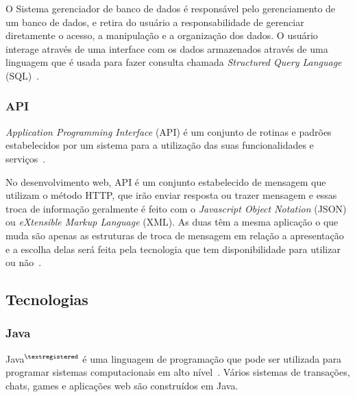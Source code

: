 

O Sistema gerenciador de banco de dados é responsável pelo gerenciamento de um banco de dados, e retira do usuário a responsabilidade de gerenciar diretamente o acesso, a manipulação e a organização dos dados.
O usuário interage através de uma interface com os dados armazenados através de uma linguagem que é usada para fazer consulta chamada \textit{Structured Query Language} (SQL)~\cite{laundon2007sistemas}.

\subsubsection{API}

 \textit{Application Programming Interface} (API) é um conjunto de rotinas e padrões estabelecidos por um sistema para a utilização das suas funcionalidades e serviços~\cite{howe2002foldoc}.
 
 No desenvolvimento web, API é um conjunto estabelecido de mensagem que utilizam o método HTTP, que irão enviar resposta ou trazer mensagem e essas troca de informação geralmente é feito com o \textit{Javascript Object Notation} (JSON) ou \textit{eXtensible Markup Language} (XML).
 As duas têm a mesma aplicação o que muda são apenas as estruturas de troca de mensagem em relação a apresentação e a escolha delas será feita pela tecnologia que tem disponibilidade para utilizar ou não~\cite{oliveira2015desenvolvimento}.

\subsection{Tecnologias}


\subsubsection{Java}

Java$^{\tiny{\textregistered}}$ é uma linguagem de programação que pode ser utilizada para programar sistemas computacionais em alto nível~\cite{batista2017desenvolvendo}. 
Vários sistemas de transações, chats, games e aplicações web são construídos em Java.

